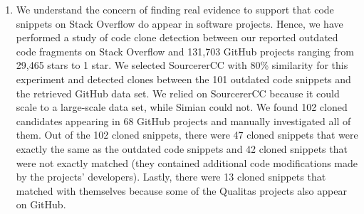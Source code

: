 \documentclass[a4paper,twoside,10pt]{reviewresponse}
\begin{document}
\begin{enumerate}
	\item We understand the concern of finding real evidence to support that code snippets on Stack Overflow do appear in software projects. Hence, we have performed a study of code clone detection between our reported outdated code fragments on Stack Overflow and 131,703 GitHub projects ranging from 29,465 stars to 1 star. We selected SourcererCC with 80\% similarity for this experiment and detected clones between the 101 outdated code snippets and the retrieved GitHub data set. We relied on SourcererCC because it could scale to a large-scale data set, while Simian could not. We found 102 cloned candidates appearing in 68 GitHub projects and manually investigated all of them. Out of the 102 cloned snippets, there were 47 cloned snippets that were exactly the same as the outdated code snippets and 42 cloned snippets that were not exactly matched (they contained additional code modifications made by the projects' developers). Lastly, there were 13 cloned snippets that matched with themselves because some of the Qualitas projects also appear on GitHub. 


\end{enumerate}
\end{document}
